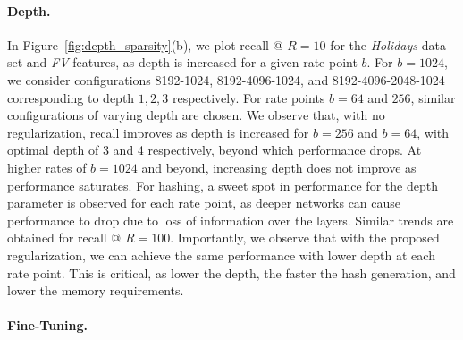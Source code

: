\documentclass[10pt,twocolumn,letterpaper]{article}
\begin{document}
\vspace{-0.1em}
\paragraph{Depth.}
In Figure~\ref{fig:depth_sparsity}(b), we plot recall @ $R=10$ for the {\it Holidays} data set and {\it FV} features, as depth is increased for a given rate point $b$.
For $b=1024$, we consider configurations 8192-1024, 8192-4096-1024, and 8192-4096-2048-1024 corresponding to depth $1,2,3$ respectively. 
For rate points $b=64$ and $256$, similar configurations of varying depth are chosen.
We observe that, with no regularization, recall improves as depth is increased for $b=256$ and $b=64$, with optimal depth of 3 and 4 respectively, beyond which performance drops.
At higher rates of $b=1024$ and beyond, increasing depth does not improve as performance saturates.
For hashing, a sweet spot in performance for the depth parameter is observed for each rate point, as deeper networks can cause performance to drop due to loss of information over the layers.
Similar trends are obtained for recall @ $R=100$.
Importantly, we observe that with the proposed regularization, we can achieve the same performance with lower depth at each rate point.
This is critical, as lower the depth, the faster the hash generation, and lower the memory requirements.

\vspace{-0.1em}
\paragraph{Fine-Tuning.}
\end{document}
